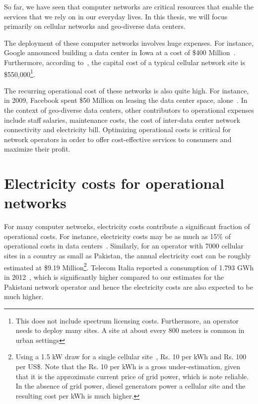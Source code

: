 So far, we have seen that computer networks are critical resources that enable the services that we rely on in our everyday lives. In this thesis, we will focus primarily on cellular networks and geo-diverse data centers. 

The deployment of these computer networks involves huge expenses. For instance, Google announced building a data center in Iowa at a cost of \$400 Million~\cite{CostOfADC}. Furthermore, according to~\cite{costcellsite}, the capital cost of a typical cellular network site is \$550,000\footnote{This does not include spectrum licensing costs. Furthermore, an operator needs to deploy many sites. A site at about every 800 meters is common in urban settings}. 

The recurring operational cost of these networks is also quite high. For instance, in 2009, Facebook spent \$50 Million on leasing the data center space, alone~\cite{FBLease}. In the context of geo-diverse data centers, other contributors to operational expenses include staff salaries, maintenance costs, the cost of inter-data center network connectivity and electricity bill. Optimizing operational costs is critical for network operators in order to offer cost-effective services to consumers and maximize their profit.

\section{Electricity costs for operational networks} 
For many computer networks, electricity costs contribute a significant fraction of operational costs. For instance, electricity costs may be as much as 15\% of operational costs in data centers~\cite{costCloud}. Similarly, for an operator with 7000 cellular sites in a country as small as Pakistan, the annual electricity cost can be roughly estimated at \$9.19 Million\footnote{Using a 1.5 kW draw for a single cellular site~\cite{mbakwe:btshybribpower:2011:necec}, Rs. 10 per kWh and Rs. 100 per US\$. Note that the Rs. 10 per kWh is a gross under-estimation, given that it is the approximate current price of grid power, which is note reliable. In the absence of grid power, diesel generators power a cellular site and the resulting cost per kWh is much higher.}. Telecom Italia reported a consumption of 1.793 GWh in 2012~\cite{TIAnnualReport}, which is significantly higher compared to our estimates for the Pakistani network operator and hence the electricity costs are also expected to be much higher. 


